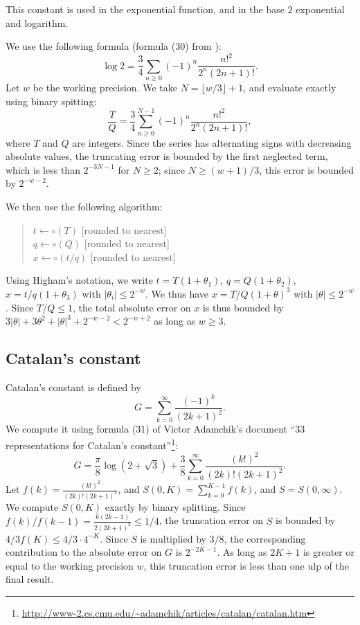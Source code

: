 \documentclass[12pt]{amsart}
\begin{document}
This constant is used in the exponential function,
and in the base $2$ exponential and logarithm.

We use the following formula (formula (30) from \cite{GoSe04}):
\[ \log 2 = \frac{3}{4} \sum_{n \geq 0} (-1)^n \frac{{n!}^2}{2^n (2n+1)!}. \]
Let $w$ be the working precision. We take $N = \lfloor w/3 \rfloor + 1$,
and evaluate exactly using binary spitting:
\[ \frac{T}{Q}
 = \frac{3}{4} \sum_{n \geq 0}^{N-1} (-1)^n \frac{{n!}^2}{2^n (2n+1)!}, \]
where $T$ and $Q$ are integers.
Since the series has alternating signs with decreasing absolute values,
the truncating error is bounded by the first neglected term,
which is less than $2^{-3N-1}$ for $N \geq 2$;
since $N \geq (w+1)/3$, this error is bounded by $2^{-w-2}$.

We then use the following algorithm:
\begin{quote}
$t \leftarrow \circ(T)$ [rounded to nearest] \\
$q \leftarrow \circ(Q)$ [rounded to nearest] \\
$x \leftarrow \circ(t/q)$ [rounded to nearest]
\end{quote}
Using Higham's notation, we write $t = T (1+\theta_1)$,
$q = Q (1+\theta_2)$, $x = t/q (1+\theta_3)$ with $|\theta_i| \leq 2^{-w}$.
We thus have $x = T/Q (1+\theta)^3$ with $|\theta| \leq 2^{-w}$.
Since $T/Q \leq 1$, the total absolute error on $x$ is thus bounded by
$3 |\theta| + 3 \theta^2 + |\theta|^3 + 2^{-w-2} < 2^{-w+2}$ as long
as $w \geq 3$.

\subsection{Catalan's constant}

Catalan's constant is defined by
\[ G = \sum_{k=0}^{\infty} \frac{(-1)^k}{(2k+1)^2}. \]
We compute it using formula (31) of Victor Adamchik's document
``33 representations for Catalan's constant''\footnote{
\url{http://www-2.cs.cmu.edu/~adamchik/articles/catalan/catalan.htm}}:
\[ G = \frac{\pi}{8} \log(2 + \sqrt{3}) + \frac{3}{8}
  \sum_{k=0}^{\infty} \frac{(k!)^2}{(2k)! (2k+1)^2}. \]
Let $f(k) = \frac{(k!)^2}{(2k)! (2k+1)^2}$, and
$S(0,K) = \sum_{k=0}^{K-1} f(k)$, and $S = S(0, \infty)$.
We compute $S(0,K)$
exactly by binary splitting.
Since $f(k)/f(k-1) = \frac{k (2k-1)}{2 (2k+1)^2} \leq 1/4$,
the truncation error on $S$ is bounded by $4/3 f(K) \leq 4/3 \cdot 4^{-K}$.
Since $S$ is multiplied by $3/8$, the corresponding contribution to the
absolute error on $G$ is $2^{-2K-1}$.
As long as $2K + 1$ is greater or equal to the working precision $w$, this
truncation error is less than one ulp of the final result.
\end{document}
